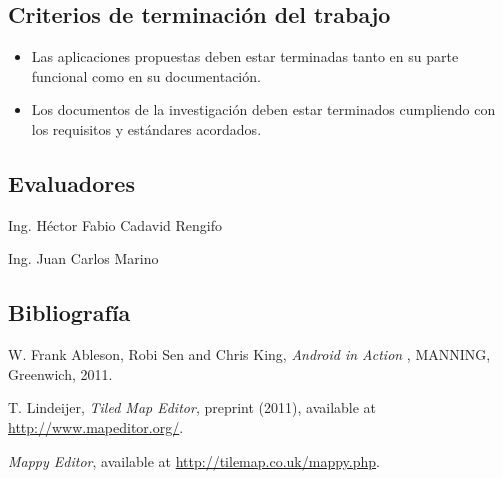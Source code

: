 \documentclass[letterpaper,11pt]{article}
\begin{document}
	\subsection{Criterios de terminación del trabajo}
	
	\begin{itemize}
		\item Las aplicaciones propuestas deben estar terminadas tanto 
		en su parte funcional como en su documentación.

		\item Los documentos de la investigación deben estar terminados 
		cumpliendo con los requisitos y estándares acordados.
	\end{itemize}
	
	\subsection{Evaluadores}
	
	Ing. Héctor Fabio Cadavid Rengifo
	
	Ing. Juan Carlos Marino 	
	
	\subsection{Bibliografía}
	
	\begin{thebibliography}{9}
	
		W. Frank Ableson, Robi Sen and Chris King, \emph{Android in Action
		}, MANNING, Greenwich, 2011.
		
		 T. Lindeijer, \emph{Tiled Map Editor},  
		preprint (2011), available at 
		\url{http://www.mapeditor.org/}.
		
		 \emph{Mappy Editor},  
		available at 
		\url{http://tilemap.co.uk/mappy.php}.

	\end{thebibliography}
\end{document}
